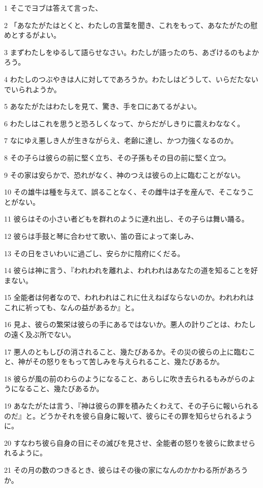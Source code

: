 \par 1 そこでヨブは答えて言った、
\par 2 「あなたがたはとくと、わたしの言葉を聞き、これをもって、あなたがたの慰めとするがよい。
\par 3 まずわたしをゆるして語らせなさい。わたしが語ったのち、あざけるのもよかろう。
\par 4 わたしのつぶやきは人に対してであろうか。わたしはどうして、いらだたないでいられようか。
\par 5 あなたがたはわたしを見て、驚き、手を口にあてるがよい。
\par 6 わたしはこれを思うと恐ろしくなって、からだがしきりに震えわななく。
\par 7 なにゆえ悪しき人が生きながらえ、老齢に達し、かつ力強くなるのか。
\par 8 その子らは彼らの前に堅く立ち、その子孫もその目の前に堅く立つ。
\par 9 その家は安らかで、恐れがなく、神のつえは彼らの上に臨むことがない。
\par 10 その雄牛は種を与えて、誤ることなく、その雌牛は子を産んで、そこなうことがない。
\par 11 彼らはその小さい者どもを群れのように連れ出し、その子らは舞い踊る。
\par 12 彼らは手鼓と琴に合わせて歌い、笛の音によって楽しみ、
\par 13 その日をさいわいに過ごし、安らかに陰府にくだる。
\par 14 彼らは神に言う、『われわれを離れよ、われわれはあなたの道を知ることを好まない。
\par 15 全能者は何者なので、われわれはこれに仕えねばならないのか。われわれはこれに祈っても、なんの益があるか』と。
\par 16 見よ、彼らの繁栄は彼らの手にあるではないか。悪人の計りごとは、わたしの遠く及ぶ所でない。
\par 17 悪人のともしびの消されること、幾たびあるか。その災の彼らの上に臨むこと、神がその怒りをもって苦しみを与えられること、幾たびあるか。
\par 18 彼らが風の前のわらのようになること、あらしに吹き去られるもみがらのようになること、幾たびあるか。
\par 19 あなたがたは言う、『神は彼らの罪を積みたくわえて、その子らに報いられるのだ』と。どうかそれを彼ら自身に報いて、彼らにその罪を知らせられるように。
\par 20 すなわち彼ら自身の目にその滅びを見させ、全能者の怒りを彼らに飲ませられるように。
\par 21 その月の数のつきるとき、彼らはその後の家になんのかかわる所があろうか。
